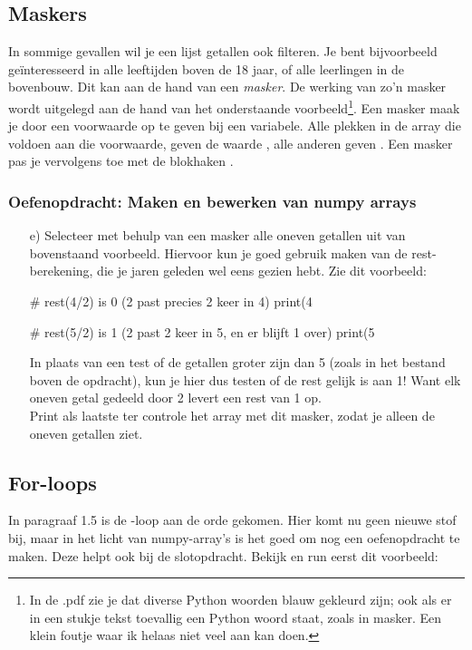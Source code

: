 \documentclass[a4paper,11pt, fleqn]{article}
\begin{document}
\subsection{Maskers}
In sommige gevallen wil je een lijst getallen ook filteren. Je bent bijvoorbeeld geïnteresseerd in alle leeftijden boven de 18 jaar, of alle leerlingen in de bovenbouw. Dit kan aan de hand van een {\it masker}. De werking van zo'n masker wordt uitgelegd aan de hand van het onderstaande voorbeeld\footnote{In de .pdf zie je dat diverse Python woorden blauw gekleurd zijn; ook als er in een stukje tekst toevallig een Python woord staat, zoals in masker. Een klein foutje waar ik helaas niet veel aan kan doen.}.
Een masker maak je door een voorwaarde op te geven bij een variabele. Alle plekken in de array die voldoen aan die voorwaarde, geven de waarde , alle anderen geven . Een masker pas je vervolgens toe met de blokhaken \pythoninline{[ ]}.


\subsubsection*{Oefenopdracht: Maken en bewerken van numpy arrays}
\begin{itemize}
	\item[e)] Selecteer met behulp van een masker alle oneven getallen uit  van bovenstaand voorbeeld. Hiervoor kun je goed gebruik maken van de rest-berekening, die je jaren geleden wel eens gezien hebt. Zie dit voorbeeld:
	\begin{python}
# rest(4/2) is 0 (2 past precies 2 keer in 4)
print(4 %

# rest(5/2) is 1 (2 past 2 keer in 5, en er blijft 1 over)
print(5 %
	\end{python}
	In plaats van een test of de getallen groter zijn dan 5 (zoals in het bestand boven de opdracht), kun je hier dus testen of de rest gelijk is aan 1! Want elk oneven getal gedeeld door 2 levert een rest van 1 op.\\
	Print als laatste ter controle het array met dit masker, zodat je alleen de oneven getallen ziet.
\end{itemize}

\subsection{For-loops}
In paragraaf 1.5 is de -loop aan de orde gekomen. Hier komt nu geen nieuwe stof bij, maar in het licht van numpy-array's is het goed om nog een oefenopdracht te maken. Deze helpt ook bij de slotopdracht. Bekijk en run eerst dit voorbeeld:
\end{document}

